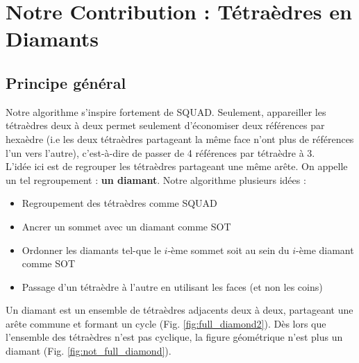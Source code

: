 \section{Notre Contribution : Tétraèdres en Diamants}
\subsection{Principe général}
\noindent
Notre algorithme s'inspire fortement de SQUAD. Seulement, appareiller les tétraèdres deux à deux permet seulement d'économiser deux références par hexaèdre (i.e les deux tétraèdres partageant la même face n'ont plus de références l'un vers l'autre), c'est-à-dire de passer de 4 références par tétraèdre à 3.\\
L'idée ici est de regrouper les tétraèdres partageant une même arête. On appelle un tel regroupement : \textbf{un diamant}. Notre algorithme plusieurs idées :
\begin{itemize}
\item Regroupement des tétraèdres comme SQUAD
\item Ancrer un sommet avec un diamant comme SOT
\item Ordonner les diamants tel-que le $i$-ème sommet soit au sein du $i$-ème diamant comme SOT
\item Passage d'un tétraèdre à l'autre en utilisant les faces (et non les coins)\\
\end{itemize}
Un diamant est un ensemble de tétraèdres adjacents deux à deux, partageant une arête commune et formant un cycle (Fig. \ref{fig:full_diamond2}). Dès lors que l'ensemble des tétraèdres n'est pas cyclique, la figure géométrique n'est plus un diamant (Fig. \ref{fig:not_full_diamond}).
